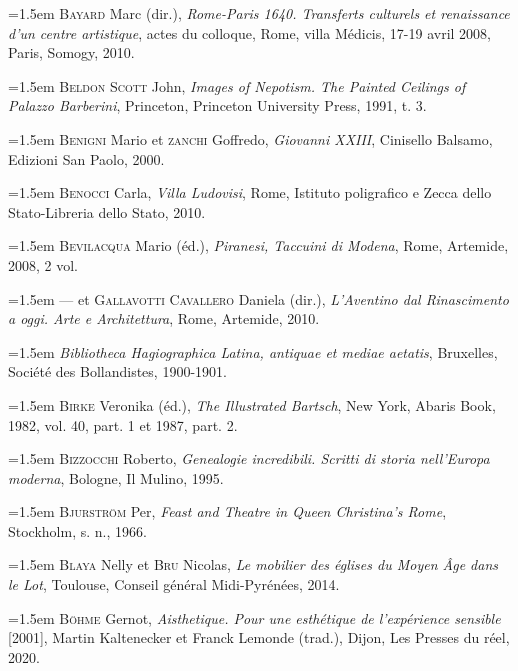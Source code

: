 \documentclass[12pt,twoside,openany]{book}
\newenvironment{PurhBibliography}
  {%
    \par
    \setlength{\parindent}{0pt}%
    \setlength{\leftskip}{0pt}%
  }
  {%
    \par
  }
\begin{document}
\begin{PurhBibliography}
\noindent\hangindent=1.5em \textsc{Bayard} Marc (dir.), \textit{Rome-Paris 1640. Transferts culturels et renaissance d’un centre artistique}, actes du colloque, Rome, villa Médicis, 17-19 avril 2008, Paris, Somogy, 2010.\par
\noindent\hangindent=1.5em \textsc{Beldon Scott} John, \textit{Images of Nepotism. The Painted Ceilings of Palazzo Barberini}, Princeton, Princeton University Press, 1991, t. 3.\par
\noindent\hangindent=1.5em \textsc{Benigni} Mario et \textsc{zanchi} Goffredo, \textit{Giovanni XXIII}, Cinisello Balsamo, Edizioni San Paolo, 2000.\par
\noindent\hangindent=1.5em \textsc{Benocci} Carla, \textit{Villa Ludovisi}, Rome, Istituto poligrafico e Zecca dello Stato-Libreria dello Stato, 2010.\par
\noindent\hangindent=1.5em \textsc{Bevilacqua} Mario (éd.), \textit{Piranesi, Taccuini di Modena}, Rome, Artemide, 2008, 2 vol.\par
\noindent\hangindent=1.5em — et \textsc{Gallavotti Cavallero} Daniela (dir.), \textit{L’Aventino dal Rinascimento a oggi. Arte e Architettura}, Rome, Artemide, 2010.\par
\noindent\hangindent=1.5em \textit{Bibliotheca Hagiographica Latina, antiquae et mediae aetatis}, Bruxelles, Société des Bollandistes, 1900-1901.\par
\noindent\hangindent=1.5em \textsc{Birke} Veronika (éd.), \textit{The Illustrated Bartsch}, New York, Abaris Book, 1982, vol. 40, part. 1 et 1987, part. 2.\par
\noindent\hangindent=1.5em \textsc{Bizzocchi} Roberto, \textit{Genealogie incredibili. Scritti di storia nell’Europa moderna}, Bologne, Il Mulino, 1995.\par
\noindent\hangindent=1.5em \textsc{Bjurström} Per, \textit{Feast and Theatre in Queen Christina’s Rome}, Stockholm, s. n., 1966.\par
\noindent\hangindent=1.5em \textsc{Blaya} Nelly et \textsc{Bru} Nicolas, \textit{Le mobilier des églises du Moyen Âge dans le Lot}, Toulouse, Conseil général Midi-Pyrénées, 2014.\par
\noindent\hangindent=1.5em \textsc{Böhme} Gernot, \textit{Aisthetique. Pour une esthétique de l’expérience sensible }[2001], Martin Kaltenecker et Franck Lemonde (trad.), Dijon, Les Presses du réel, 2020.\par

\end{PurhBibliography}
\end{document}
